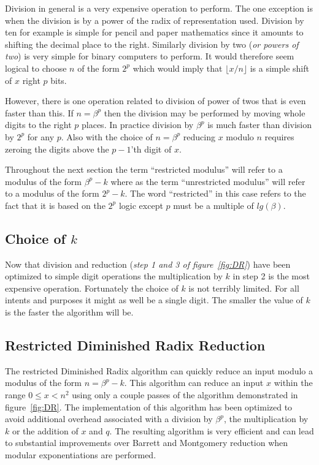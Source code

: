 \documentclass[b5paper]{book}
\begin{document}
Division in general is a very expensive operation to perform.  The one exception is when the division is by a power of the radix of representation used.  
Division by ten for example is simple for pencil and paper mathematics since it amounts to shifting the decimal place to the right.  Similarly division 
by two (\textit{or powers of two}) is very simple for binary computers to perform.  It would therefore seem logical to choose $n$ of the form $2^p$ 
which would imply that $\lfloor x / n \rfloor$ is a simple shift of $x$ right $p$ bits.  

However, there is one operation related to division of power of twos that is even faster than this.  If $n = \beta^p$ then the division may be 
performed by moving whole digits to the right $p$ places.  In practice division by $\beta^p$ is much faster than division by $2^p$ for any $p$.  
Also with the choice of $n = \beta^p$ reducing $x$ modulo $n$ requires zeroing the digits above the $p-1$'th digit of $x$.  

Throughout the next section the term ``restricted modulus'' will refer to a modulus of the form $\beta^p - k$ where as the term ``unrestricted
modulus'' will refer to a modulus of the form $2^p - k$.  The word ``restricted'' in this case refers to the fact that it is based on the 
$2^p$ logic except $p$ must be a multiple of $lg(\beta)$.  

\subsection{Choice of $k$}
Now that division and reduction (\textit{step 1 and 3 of figure~\ref{fig:DR}}) have been optimized to simple digit operations the multiplication by $k$
in step 2 is the most expensive operation.  Fortunately the choice of $k$ is not terribly limited.  For all intents and purposes it might
as well be a single digit.  The smaller the value of $k$ is the faster the algorithm will be.  

\subsection{Restricted Diminished Radix Reduction}
The restricted Diminished Radix algorithm can quickly reduce an input modulo a modulus of the form $n = \beta^p - k$.  This algorithm can reduce 
an input $x$ within the range $0 \le x < n^2$ using only a couple passes of the algorithm demonstrated in figure~\ref{fig:DR}.  The implementation
of this algorithm has been optimized to avoid additional overhead associated with a division by $\beta^p$, the multiplication by $k$ or the addition 
of $x$ and $q$.  The resulting algorithm is very efficient and can lead to substantial improvements over Barrett and Montgomery reduction when modular 
exponentiations are performed.
\end{document}
